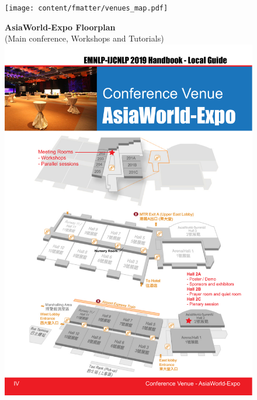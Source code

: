 

\begin{figure}[p]
\centering
\texttt{[image: content/fmatter/venues\_map.pdf]}
\end{figure}

\begin{figure}[p]
\centering
\textbf{AsiaWorld-Expo Floorplan}\\
(Main conference, Workshops and Tutorials)
\vspace{3em}
\includegraphics[width=\textwidth]{content/fmatter/AsianWorldExpo_map.pdf}
\end{figure}

